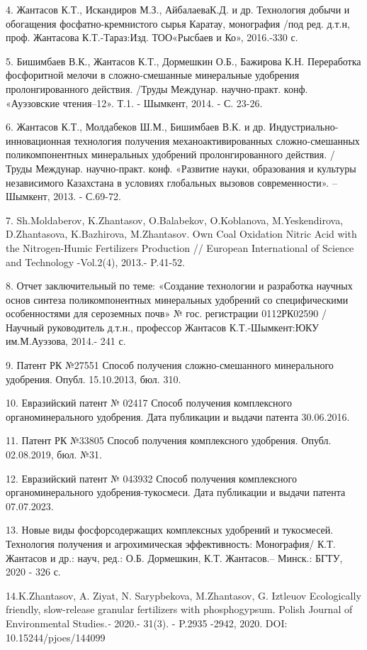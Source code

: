 4. Жантасов К.Т., Искандиров М.З., АйбалаеваК.Д. и др. Технология добычи
и обогащения фосфатно-кремнистого сырья Каратау, монография /под ред.
д.т.н, проф. Жантасова К.Т.-Тараз:Изд. ТОО«Рысбаев и Ко», 2016.-330 с.

5. Бишимбаев В.К., Жантасов К.Т., Дормешкин О.Б., Бажирова К.Н.
Переработка фосфоритной мелочи в сложно-смешанные минеральные удобрения
пролонгированного действия. /Труды Междунар. научно-практ. конф.
«Ауэзовские чтения--12». Т.1. - Шымкент, 2014. - С. 23-26.

6. Жантасов К.Т., Молдабеков Ш.М., Бишимбаев В.К. и др.
Индустриально-инновационная технология получения механоактивированных
сложно-смешанных поликомпонентных минеральных удобрений
пролонгированного действия. / Труды Междунар. научно-практ. конф.
«Развитие науки, образования и культуры независимого Казахстана в
условиях глобальных вызовов современности». -- Шымкент, 2013. - С.69-72.

7. Sh.Moldaberov, K.Zhantasov, O.Balabekov, O.Koblanova, M.Yeskendirova,
D.Zhantasova, K.Bazhirova, M.Zhantasov. Own Coal Oxidation Nitric Acid
with the Nitrogen-Humic Fertilizers Production // European International
of Science and Technology -Vol.2(4), 2013.- P.41-52.

8. Отчет заключительный по теме: «Создание технологии и разработка
научных основ синтеза поликомпонентных минеральных удобрений со
специфическими особенностями для сероземных почв» № гос. регистрации
0112РК02590 / Научный руководитель д.т.н., профессор Жантасов
К.Т.-Шымкент:ЮКУ им.М.Ауэзова, 2014.- 241 с.

9. Патент РК №27551 Способ получения сложно-смешанного минерального
удобрения. Опубл. 15.10.2013, бюл. 310.

10. Евразийский патент № 02417 Способ получения комплексного
органоминерального удобрения. Дата публикации и выдачи патента
30.06.2016.

11. Патент РК №33805 Способ получения комплексного удобрения. Опубл.
02.08.2019, бюл. №31.

12. Евразийский патент № 043932 Способ получения комплексного
органоминерального удобрения-тукосмеси. Дата публикации и выдачи патента
07.07.2023.

13. Новые виды фосфорсодержащих комплексных удобрений и тукосмесей.
Технология получения и агрохимическая эффективность: Монография/ К.Т.
Жантасов и др.: науч, ред.: О.Б. Дормешкин, К.Т. Жантасов.-- Минск.:
БГТУ, 2020 - 326 с.

14.K.Zhantasov, A. Ziyat, N. Sarypbekova, M.Zhantasov, G. Iztleuov
Ecologically friendly, slow-release granular fertilizers with
phosphogypsum. Polish Journal of Environmental Studies\emph{.-} 2020.-
31(3). - P.2935 -2942, 2020. DOI: 10.15244/pjoes/144099

